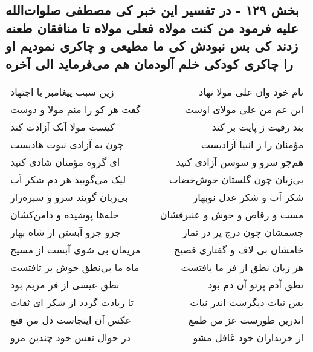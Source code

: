 \begin{center}
\section*{بخش ۱۲۹ - در تفسیر این خبر کی مصطفی صلوات‌الله علیه فرمود من کنت مولاه فعلی مولاه تا منافقان طعنه زدند کی بس نبودش کی ما مطیعی و چاکری نمودیم او را چاکری کودکی خلم آلودمان هم می‌فرماید الی آخره}
\label{sec:sh129}
\begin{longtable}{l p{0.5cm} r}
زین سبب پیغامبر با اجتهاد
&&
نام خود وان علی مولا نهاد
\\
گفت هر کو را منم مولا و دوست
&&
ابن عم من علی مولای اوست
\\
کیست مولا آنک آزادت کند
&&
بند رقیت ز پایت بر کند
\\
چون به آزادی نبوت هادیست
&&
مؤمنان را ز انبیا آزادیست
\\
ای گروه مؤمنان شادی کنید
&&
هم‌چو سرو و سوسن آزادی کنید
\\
لیک می‌گویید هر دم شکر آب
&&
بی‌زبان چون گلستان خوش‌خضاب
\\
بی‌زبان گویند سرو و سبزه‌زار
&&
شکر آب و شکر عدل نوبهار
\\
حله‌ها پوشیده و دامن‌کشان
&&
مست و رقاص و خوش و عنبرفشان
\\
جزو جزو آبستن از شاه بهار
&&
جسمشان چون درج پر در ثمار
\\
مریمان بی شوی آبست از مسیح
&&
خامشان بی لاف و گفتاری فصیح
\\
ماه ما بی‌نطق خوش بر تافتست
&&
هر زبان نطق از فر ما یافتست
\\
نطق عیسی از فر مریم بود
&&
نطق آدم پرتو آن دم بود
\\
تا زیادت گردد از شکر ای ثقات
&&
پس نبات دیگرست اندر نبات
\\
عکس آن اینجاست ذل من قنع
&&
اندرین طورست عز من طمع
\\
در جوال نفس خود چندین مرو
&&
از خریداران خود غافل مشو
\\
\end{longtable}
\end{center}
